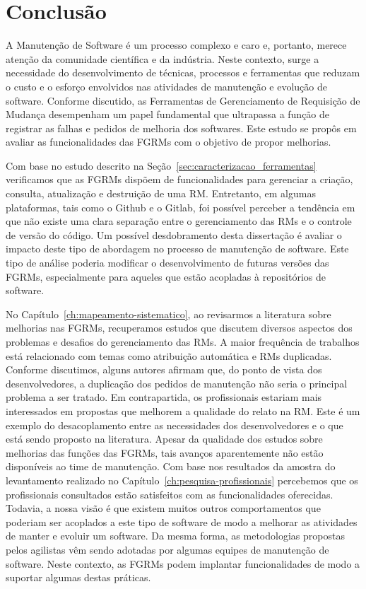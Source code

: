 \chapter{Conclusão}
\label{ch:conclusao_trab_futuros}

A Manutenção de Software é um processo complexo e caro e, portanto, merece
atenção da comunidade científica e da indústria. Neste contexto, surge a
necessidade do desenvolvimento de técnicas, processos e ferramentas que reduzam
o custo e o esforço envolvidos nas atividades de manutenção e evolução de
software. Conforme discutido, as Ferramentas de Gerenciamento de Requisição de
Mudança desempenham um papel fundamental que ultrapassa a função de registrar as
falhas e pedidos de melhoria dos softwares. Este estudo se propôs em avaliar as
funcionalidades das FGRMs com o objetivo de propor melhorias.

Com base no estudo descrito na Seção~\ref{sec:caracterizacao_ferramentas}
verificamos que as FGRMs dispõem de funcionalidades para gerenciar a criação,
consulta, atualização e destruição de uma RM\@. Entretanto, em algumas
plataformas, tais como o Github e o Gitlab, foi possível perceber a tendência em
que não existe uma clara separação entre o gerenciamento das RMs e o controle de
versão do código. Um possível desdobramento desta dissertação é avaliar o
impacto deste tipo de abordagem no processo de manutenção de software. Este tipo
de análise poderia modificar o desenvolvimento de futuras versões das FGRMs,
especialmente para aqueles que estão acopladas à repositórios de software.

No Capítulo~\ref{ch:mapeamento-sistematico}, ao revisarmos a literatura sobre
melhorias nas FGRMs, recuperamos estudos que discutem diversos aspectos dos
problemas e desafios do gerenciamento das RMs. A maior frequência de trabalhos
está relacionado com temas como atribuição automática e RMs duplicadas. Conforme
discutimos, alguns autores afirmam que, do ponto de vista dos desenvolvedores, a
duplicação dos pedidos de manutenção não seria o principal problema a ser
tratado. Em contrapartida, os profissionais estariam mais interessados em
propostas que melhorem a qualidade do relato na RM\@. Este é um exemplo do
desacoplamento entre as necessidades dos desenvolvedores e o que está sendo
proposto na literatura. Apesar da qualidade dos estudos sobre melhorias das
funções das FGRMs, tais avanços aparentemente não estão disponíveis ao time de
manutenção. Com base nos resultados da amostra do levantamento realizado no
Capítulo~\ref{ch:pesquisa-profissionais} percebemos que os profissionais
consultados estão satisfeitos com as funcionalidades oferecidas. Todavia, a
nossa visão é que existem muitos outros comportamentos que poderiam ser
acoplados a este tipo de software de modo a melhorar as atividades de manter e
evoluir um software. Da mesma forma, as metodologias propostas pelos agilistas
vêm sendo adotadas por algumas equipes de manutenção de software. Neste
contexto, as FGRMs podem implantar funcionalidades de modo a suportar algumas
destas práticas.

